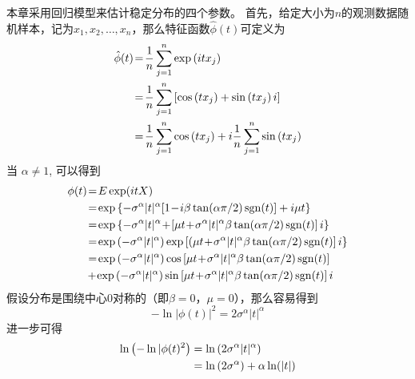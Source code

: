 本章采用回归模型来估计稳定分布的四个参数。
首先，给定大小为$n$的观测数据随机样本，记为$x_1, x_2, \ldots, x_n$，那么特征函数$\hat{\phi}(t)$可定义为
\begin{align}
	\hat{\phi}(t)&\!=\!\frac{1}{n} \sum_{j=1}^{n} \exp \left(i t x_{j}\right) \notag \\
	&\!=\!\frac{1}{n} \sum_{j=1}^{n}\left[\cos \left(t x_{j}\right)+\sin \left(t x_{j}\right) i\right] \notag \\
	&\!=\!\frac{1}{n} \sum_{j=1}^{n} \cos \left(t x_{j}\right)+i \frac{1}{n} \sum_{j=1}^{n} \sin \left(t x_{j}\right)
\end{align}
当 $\alpha \neq 1$, 可以得到
\begin{align}
	\phi(t) 
	&\!=\!E \exp (i t X) \notag \\ 
	&\!=\!\exp \left\{-\sigma^{\alpha}|t|^{\alpha}[1\!-\!i \beta \tan (\alpha \pi / 2) \operatorname{sgn}(t)]+i \mu t\right\} \notag \\ 
	&\!=\!\exp \left\{-\sigma^{\alpha}|t|^{\alpha}\!+\!\left[\mu t\!+\!\sigma^{\alpha}|t|^{\alpha} \beta \tan (\alpha \pi / 2) \operatorname{sgn}(t)\right] i\right\} \notag \\  
	&\!=\!\exp \left(-\sigma^{\alpha}|t|^{\alpha}\right) \exp \left[\left(\mu t\!+\!\sigma^{\alpha}|t|^{\alpha} \beta \tan (\alpha \pi / 2) \operatorname{sgn}(t)\right] i\right\} \notag \\ 
	&\!=\!\exp \left(-\sigma^{\alpha}|t|^{\alpha}\right) \cos \left[\mu t\!+\!\sigma^{\alpha}|t|^{\alpha} \beta \tan (\alpha \pi / 2) \operatorname{sgn}(t)\right] \notag \\ 
	&\!+\!\exp \left(-\sigma^{\alpha}|t|^{\alpha}\right) \sin \left[\mu t\!+\!\sigma^{\alpha}|t|^{\alpha} \beta \tan (\alpha \pi / 2) \operatorname{sgn}(t)\right] i 
\label{equ 6-5}
\end{align}
假设分布是围绕中心$0$对称的（即$\beta = 0$，$\mu = 0$），那么容易得到
\begin{equation}
	-\ln |\phi(t)|^{2}=2 \sigma^{\alpha}|t|^{\alpha}
\end{equation}
进一步可得
\begin{align} 
	\ln \left(-\ln | \phi(t)^{2}\right)
	&= \ln \left(2 \sigma^{\alpha}|t|^{\alpha}\right) \notag \\ 
	&=\ln \left(2 \sigma^{\alpha}\right)+\alpha \ln (|t|) 
\end{align}


